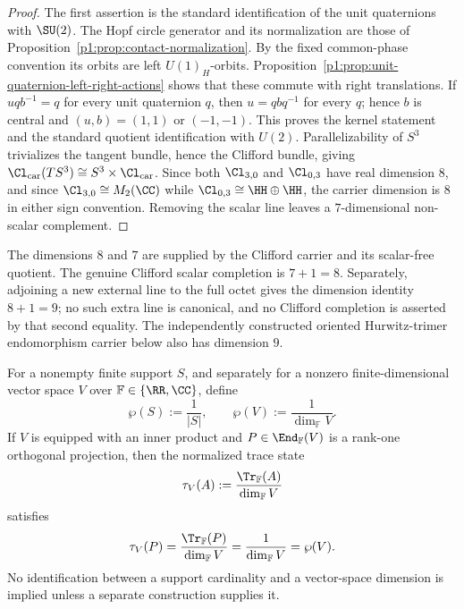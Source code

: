 \documentclass[11pt]{article}
\begin{document}
\begin{proof}
The first assertion is the standard identification of the unit quaternions with
\(\SU(2)\).  The Hopf circle generator and its normalization are those of
Proposition~\ref{p1:prop:contact-normalization}.  By the fixed common-phase
convention its orbits are left \(U(1)_H\)-orbits.
Proposition~\ref{p1:prop:unit-quaternion-left-right-actions}
shows that these commute with right translations.  If \(u q b^{-1}=q\) for
every unit quaternion \(q\), then \(u=q bq^{-1}\) for every \(q\); hence
\(b\) is central and \((u,b)=(1,1)\) or \((-1,-1)\).  This proves the kernel
statement and the standard quotient identification with \(U(2)\).
Parallelizability of \(S^3\)
trivializes the tangent bundle, hence the Clifford bundle, giving
\(\Cl_{\mathrm{car}}(TS^3)\cong S^3\times\Cl_{\mathrm{car}}\).  Since both \(\Cl_{3,0}\) and \(\Cl_{0,3}\) have real dimension \(8\), and since \(\Cl_{3,0}\cong M_2(\CC)\) while \(\Cl_{0,3}\cong\HH\oplus\HH\), the carrier dimension is \(8\) in either sign convention.  Removing the scalar line leaves a \(7\)-dimensional non-scalar complement.
\end{proof}

\begin{remark}
The dimensions \(8\) and \(7\) are supplied by the Clifford carrier and its
scalar-free quotient.  The genuine Clifford scalar completion is
\(7+1=8\).  Separately, adjoining a new external line to the full octet gives
the dimension identity \(8+1=9\); no such extra line is canonical, and no
Clifford completion is asserted by that second equality.  The independently
constructed oriented Hurwitz-trimer endomorphism carrier below also has
dimension \(9\).
\end{remark}

\begin{definition}
\label{p1:def:finite-carrier-weight}
For a nonempty finite support \(S\), and separately for a nonzero
finite-dimensional vector space \(V\) over
\(\mathbb F\in\{\RR,\CC\}\), define
\[
    \wp(S):=\frac{1}{|S|},
    \qquad
    \wp(V):=\frac{1}{\dim_{\mathbb F}V}.
\]
If \(V\) is equipped with an inner product and
\(P\in\End_{\mathbb F}(V)\) is a rank-one orthogonal projection, then the
normalized trace state
\[
    \tau_V(A):=\frac{\Tr_{\mathbb F}(A)}{\dim_{\mathbb F}V}
\]
satisfies
\[
    \tau_V(P)=\frac{\Tr_{\mathbb F}(P)}{\dim_{\mathbb F}V}
    =\frac{1}{\dim_{\mathbb F}V}
    =\wp(V).
\]
No identification between a support cardinality and a vector-space dimension
is implied unless a separate construction supplies it.
\end{definition}
\end{document}

